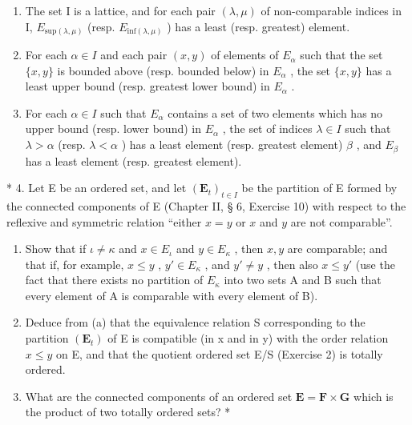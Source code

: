 \begin{enumerate}
\def\labelenumi{(\Roman{enumi})}
\item
  The set I is a lattice, and for each pair \((\lambda, \mu)\) of non-comparable indices in I, \(E_{\text{sup}(\lambda, \mu)}\) (resp. \(E_{\text{inf}(\lambda, \mu)}\) ) has a least (resp. greatest) element.
\item
  For each \(\alpha \in I\) and each pair \((x, y)\) of elements of \(E_{\alpha}\) such that the set \(\{x, y\}\) is bounded above (resp. bounded below) in \(E_{\alpha}\) , the set \(\{x, y\}\) has a least upper bound (resp. greatest lower bound) in \(E_{\alpha}\) .
\item
  For each \(\alpha \in I\) such that \(E_{\alpha}\) contains a set of two elements which has no upper bound (resp. lower bound) in \(E_{\alpha}\) , the set of indices \(\lambda \in I\) such that \(\lambda > \alpha\) (resp. \(\lambda < \alpha\) ) has a least element (resp. greatest element) \(\beta\) , and \(E_{\beta}\) has a least element (resp. greatest element).
\end{enumerate}

* 4. Let E be an ordered set, and let \((\mathbf{E}_t)_{t \in I}\) be the partition of E formed by the connected components of E (Chapter II, § 6, Exercise 10) with respect to the reflexive and symmetric relation ``either \(x = y\) or \(x\) and \(y\) are not comparable''.

\begin{enumerate}
\def\labelenumi{(\alph{enumi})}
\item
  Show that if \(\iota \neq \kappa\) and \(x \in E_{\iota}\) and \(y \in E_{\kappa}\) , then \(x, y\) are comparable; and that if, for example, \(x \leqslant y\) , \(y' \in E_{\kappa}\) , and \(y' \neq y\) , then also \(x \leqslant y'\) (use the fact that there exists no partition of \(E_{\kappa}\) into two sets A and B such that every element of A is comparable with every element of B).
\item
  Deduce from (a) that the equivalence relation S corresponding to the partition \((\mathbf{E}_{t})\) of E is compatible (in x and in y) with the order relation \(x \leqslant y\) on E, and that the quotient ordered set E/S (Exercise 2) is totally ordered.
\item
  What are the connected components of an ordered set \(\mathbf{E} = \mathbf{F} \times \mathbf{G}\) which is the product of two totally ordered sets? *
\end{enumerate}

